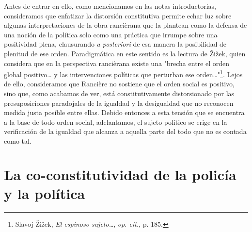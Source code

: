 \documentclass{book}
\begin{document}
Antes de entrar en ello, como mencionamos en las notas introductorias,
consideramos que enfatizar la distorsión constitutiva permite echar luz
sobre algunas interpretaciones de la obra rancièrana que la plantean
como la defensa de una noción de la política solo como una práctica que
irrumpe sobre una positividad plena, clausurando \emph{a posteriori} de
esa manera la posibilidad de plenitud de ese orden. Paradigmática en
este sentido es la lectura de Žižek, quien considera que en la
perspectiva rancièrana existe una "brecha entre el orden global
positivo\ldots{} y las intervenciones políticas que perturban ese
orden\ldots"\footnote{Slavoj Žižek, \emph{El espinoso sujeto\ldots{}},
  \emph{op. cit.}, p. 185.}. Lejos de ello, consideramos que Rancière no
sostiene que el orden social es positivo, sino que, como acabamos de
ver, está constitutivamente distorsionado por las presuposiciones
paradojales de la igualdad y la desigualdad que no reconocen medida
justa posible entre ellas. Debido entonces a esta tensión que se
encuentra a la base de todo orden social, adelantamos, el sujeto
político se erige en la verificación de la igualdad que alcanza a
aquella parte del todo que no es contada como tal.

\section{La co-constitutividad de la policía y la política}
\end{document}
